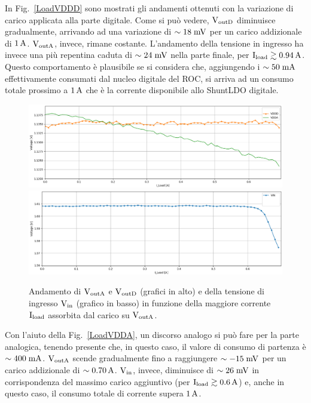 In Fig.~\ref{LoadVDDD} sono mostrati gli andamenti ottenuti con la variazione di carico applicata alla parte digitale. Come si può vedere, $\mathrm{V_{outD}}$ diminuisce gradualmente, arrivando ad una variazione di $\sim 18\rm \; mV$ per un carico addizionale di $1\rm \, A$.  $\mathrm{V_{outA}}$, invece, rimane costante. %
L'andamento della tensione in ingresso ha invece una pi\`u repentina caduta di $\sim 24\rm \; mV$ nella parte finale, per $\mathrm{I_{load}} \gtrsim 0.94\rm \, A$. Questo comportamento è plausibile se si considera che, aggiungendo i $\sim 50\rm \; mA$ effettivamente consumati dal nucleo digitale del ROC, si arriva ad un consumo totale prossimo a $1\rm \, A$ che \`e la corrente disponibile allo ShuntLDO digitale.
\begin{figure}
\centering
\includegraphics[width=\textwidth]{Immagini/LoadVDDA}
\includegraphics[width=\textwidth]{Immagini/LoadVINA}
\caption{Andamento di $\mathrm{V_{outA}}$ e $\mathrm{V_{outD}}$ (grafici in alto) e della tensione di ingresso $\mathrm{V_{in}}$ (grafico in basso) in funzione della maggiore corrente $\mathrm{I_{load}}$ assorbita dal carico su $\mathrm{V_{outA}}$.}
\label{LoadVDDA}
\label{LoadVINA}
\end{figure}
Con l'aiuto della Fig.~\ref{LoadVDDA}, un discorso analogo si può fare per la parte analogica, tenendo presente che, in questo caso, il valore di consumo di partenza \`e $\sim 400\rm \; mA$.
$\mathrm{V_{outA}}$ scende gradualmente fino a raggiungere $\sim -15\rm \; mV$ per un carico addizionale di $\sim 0.70\rm \, A$. $\mathrm{V_{in}}$, invece, diminuisce di $\sim 26\rm \; mV$ in corrispondenza del massimo carico aggiuntivo (per $\mathrm{I_{load}} \gtrsim 0.6\rm \, A$) e, anche in questo caso, il consumo totale di corrente supera $1\rm \, A$. 


